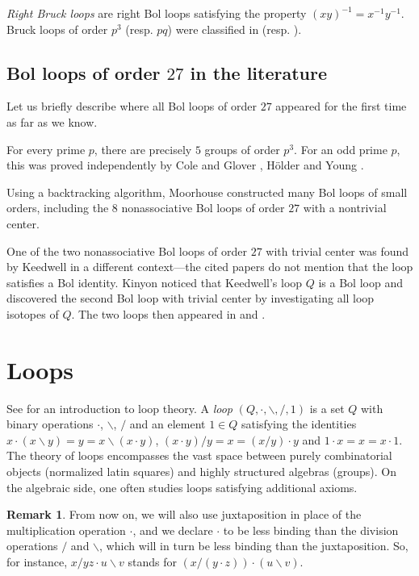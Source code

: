 \documentclass[12pt,reqno]{amsart}
\numberwithin{equation}{section}
\theoremstyle{plain}
\theoremstyle{definition}
\newtheorem*{remark*}{Remark}
\newcommand{\ldiv}{\backslash}
\newcommand{\rdiv}{/}
\begin{document}
\emph{Right Bruck loops} are right Bol loops satisfying the property $(xy)^{-1}=x^{-1}y^{-1}$. Bruck loops of order $p^3$ (resp. $pq$) were classified in \cite{BiancoBonatto} (resp. \cite{KNVpq}).

\subsection{Bol loops of order $27$ in the literature}

Let us briefly describe where all Bol loops of order $27$ appeared for the first time as far as we know.

For every prime $p$, there are precisely $5$ groups of order $p^3$. For an odd prime $p$, this was proved independently by Cole and Glover \cite{ColeGlover}, H\"older \cite{Holder} and Young \cite{Young}.

Using a backtracking algorithm, Moorhouse \cite{Moorhouse} constructed many Bol loops of small orders, including the $8$ nonassociative Bol loops of order $27$ with a nontrivial center.

One of the two nonassociative Bol loops of order $27$ with trivial center was found by Keedwell \cite{Keedwell1963,Keedwell1965} in a different context---the cited papers do not mention that the loop satisfies a Bol identity.
Kinyon noticed that Keedwell's loop $Q$ is a Bol loop and discovered the second Bol loop with trivial center by investigating all loop isotopes of $Q$. The two loops then appeared in \cite{FoguelKinyon} and \cite{KinyonWanless}.

\section{Loops}

See \cite{Bruck} for an introduction to loop theory. A \emph{loop} $(Q,\cdot,\ldiv,\rdiv,1)$ is a set $Q$ with binary operations $\cdot$, $\ldiv$, $\rdiv$ and an element $1\in Q$ satisfying the identities $x\cdot(x\ldiv y) = y = x\ldiv(x\cdot y)$, $(x\cdot y)\rdiv y = x = (x\rdiv y)\cdot y$ and $1\cdot x=x = x\cdot 1$. The theory of loops encompasses the vast space between purely combinatorial objects (normalized latin squares) and highly structured algebras (groups). On the algebraic side, one often studies loops satisfying additional axioms.

\begin{remark*}
From now on, we will also use juxtaposition in place of the multiplication operation $\cdot$, and we declare $\cdot$ to be less binding than the division operations $\rdiv$ and $\ldiv$, which will in turn be less binding than the juxtaposition. So, for instance, $x/yz\cdot u\ldiv v$ stands for $(x/(y\cdot z))\cdot (u\ldiv v)$.
\end{remark*}
\end{document}
